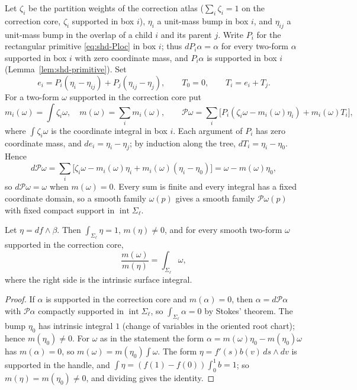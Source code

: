 Let $\zeta_i$ be the partition weights of the correction atlas ($\sum_i\zeta_i=1$ on the correction core, $\zeta_i$ supported in
box $i$), $\eta_i$ a unit-mass bump in box $i$, and $\eta_{ij}$ a unit-mass bump in the overlap of a child $i$ and its parent $j$.
Write $P_i$ for the rectangular primitive \eqref{eq:shd-Ploc} in box $i$; thus $dP_i\alpha=\alpha$ for every two-form $\alpha$
supported in box $i$ with zero coordinate mass, and $P_i\alpha$ is supported in box $i$ (Lemma~\ref{lem:shd-primitive}). Set
\[
 e_i=P_i(\eta_i-\eta_{ij})+P_j(\eta_{ij}-\eta_j),\qquad
 T_0=0,\qquad T_i=e_i+T_j .
\]
For a two-form $\omega$ supported in the correction core put
\[
 m_i(\omega)=\int\zeta_i\omega,\quad m(\omega)=\sum_i m_i(\omega),\qquad
 \mathcal P\omega=\sum_i\bigl[P_i(\zeta_i\omega-m_i(\omega)\eta_i)+m_i(\omega)T_i\bigr],
\]
where $\int\zeta_i\omega$ is the coordinate integral in box $i$. Each argument of $P_i$ has zero coordinate mass, and
$de_i=\eta_i-\eta_j$; by induction along the tree, $dT_i=\eta_i-\eta_0$. Hence
\[
 d\mathcal P\omega=\sum_i\bigl[\zeta_i\omega-m_i(\omega)\eta_i+m_i(\omega)(\eta_i-\eta_0)\bigr]=\omega-m(\omega)\eta_0 ,
\]
so $d\mathcal P\omega=\omega$ when $m(\omega)=0$. Every sum is finite and every integral has a fixed coordinate domain, so a
smooth family $\omega(p)$ gives a smooth family $\mathcal P\omega(p)$ with fixed compact support in $\operatorname{int}\Sigma_\ell$.

\begin{lemma}\label{lem:native-calibration}
Let $\eta=df\wedge\beta$. Then $\int_{\Sigma_\ell}\eta=1$, $m(\eta)\ne0$, and for every smooth two-form $\omega$ supported in the
correction core,
\[
 \frac{m(\omega)}{m(\eta)}=\int_{\Sigma_\ell}\omega ,
\]
where the right side is the intrinsic surface integral.
\end{lemma}

\begin{proof}
If $\alpha$ is supported in the correction core and $m(\alpha)=0$, then $\alpha=d\mathcal P\alpha$ with $\mathcal P\alpha$ compactly
supported in $\operatorname{int}\Sigma_\ell$, so $\int_{\Sigma_\ell}\alpha=0$ by Stokes' theorem. The bump $\eta_0$ has intrinsic
integral $1$ (change of variables in the oriented root chart); hence $m(\eta_0)\ne0$. For $\omega$ as in the statement the form
$\alpha=m(\omega)\eta_0-m(\eta_0)\omega$ has $m(\alpha)=0$, so $m(\omega)=m(\eta_0)\int\omega$. The form $\eta=f'(s)b(v)\,ds\wedge dv$
is supported in the handle, and $\int\eta=(f(1)-f(0))\int_0^1b=1$; so $m(\eta)=m(\eta_0)\ne0$, and dividing gives the identity.
\end{proof}

